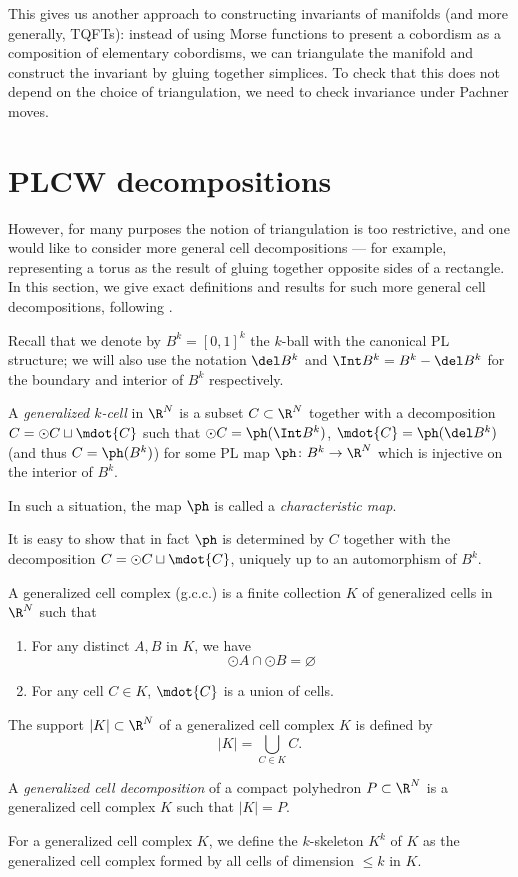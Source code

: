 This gives us another approach to constructing invariants of manifolds (and more
generally, TQFTs): instead of using Morse functions to present a cobordism as a
composition of elementary cobordisms, we can triangulate the manifold and
construct the invariant by gluing together simplices. To check that this does
not depend on the choice of triangulation, we need to check invariance under
Pachner moves.

\section{PLCW decompositions}\label{s:PLCW}
However, for many purposes the notion of triangulation is too restrictive, and
one would like to consider more general cell decompositions --- for example,
representing a torus as the result of gluing together opposite sides of a
rectangle. In this section, we give exact definitions and results for such more
general cell decompositions, following \cite{PLCW}.

Recall that we denote by $B^k=[0,1]^k$ the $k$-ball with the canonical PL
structure; we will also use the notation $\del B^k$ and $\Int B^k= B^k - \del
B^k$ for the boundary and interior of $B^k$ respectively.


\begin{definition}\label{d:gen-cell}
A \emph{generalized $k$-cell} in $\R^N$ is a subset $C\subset \R^N$ together
with a decomposition $C=\odot{C}\sqcup \mdot{C}$ such that $\odot{C}=\ph(\Int
B^k)$, $\mdot{C}=\ph(\del B^k)$ (and thus $C=\ph(B^k)$) for some PL map
$\ph\colon B^k\to \R^N$ which is injective on the interior of $B^k$.

In such a situation, the map $\ph$ is called a \emph{characteristic map}.
\end{definition} It is easy to show that in fact $\ph$ is determined by $C$
together with the decomposition $C=\odot{C}\sqcup \mdot{C}$, uniquely up to an
automorphism of $B^k$.

\begin{definition}\label{d:gen-complex}
  A generalized cell complex (g.c.c.) is a finite collection $K$ of
  generalized cells in $\R^N$ such that
  \begin{enumerate}
    \item For any distinct $A, B$ in $K$, we have
      $$
        \odot{A}\cap \odot{B}=\varnothing
      $$
    \item For any cell $C\in K$, $\mdot{C}$ is a union of cells.
  \end{enumerate}

  The support $|K|\subset \R^N$ of a generalized cell complex $K$ is defined by
  $$
    |K|=\bigcup_{C\in K}C.
  $$

  A \emph{generalized cell decomposition}
  of a compact polyhedron $P\subset \R^N$ is a generalized cell complex $K$ such
  that $|K|=P$.

  For a generalized cell complex $K$, we define the $k$-skeleton $K^k$ of
  $K$ as the generalized cell complex formed by all cells of dimension
  $\le k$ in $K$.
\end{definition}

